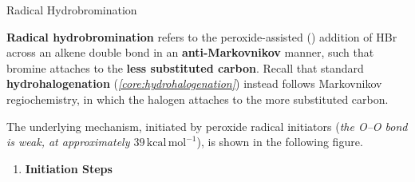 \documentclass[10pt]{article}
\begin{document}
      \begin{core}[label=core:alkene_radical_hbr]{Radical Hydrobromination}

        \textbf{Radical hydrobromination} refers to the peroxide-assisted () addition of HBr across an alkene double bond in an \textbf{anti-Markovnikov} manner, such that bromine attaches to the \textbf{less substituted carbon}. Recall that standard \textbf{hydrohalogenation} (\textit{\autoref{core:hydrohalogenation}}) instead follows Markovnikov regiochemistry, in which the halogen attaches to the more substituted carbon.


        The underlying mechanism, initiated by peroxide radical initiators (\textit{the O--O bond is weak, at approximately $39\,\text{kcal}\,\text{mol}^{-1}$}), is shown in the following figure.

        \begin{enumerate}

          \item \textbf{Initiation Steps} 


\end{enumerate}
\end{core}
\end{document}
